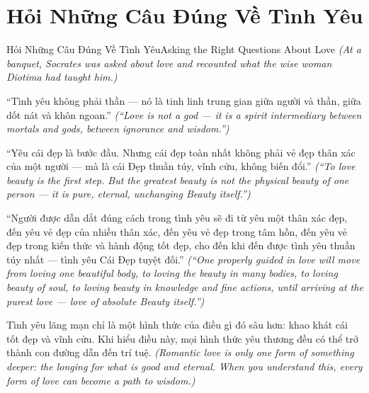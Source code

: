 \section{Hỏi Những Câu Đúng Về Tình Yêu}
\begin{truyen}{Hỏi Những Câu Đúng Về Tình Yêu}{Asking the Right Questions About Love}
\textit{(At a banquet, Socrates was asked about love and recounted what the wise woman Diotima had taught him.)}

``Tình yêu không phải thần — nó là tinh linh trung gian giữa người và thần, giữa dốt nát và khôn ngoan.''
\textit{(``Love is not a god — it is a spirit intermediary between mortals and gods, between ignorance and wisdom.'')}

``Yêu cái đẹp là bước đầu. Nhưng cái đẹp toàn nhất không phải vẻ đẹp thân xác của một người — mà là cái Đẹp thuần túy, vĩnh cửu, không biến đổi.''
\textit{(``To love beauty is the first step. But the greatest beauty is not the physical beauty of one person — it is pure, eternal, unchanging Beauty itself.'')}

``Người được dẫn dắt đúng cách trong tình yêu sẽ đi từ yêu một thân xác đẹp, đến yêu vẻ đẹp của nhiều thân xác, đến yêu vẻ đẹp trong tâm hồn, đến yêu vẻ đẹp trong kiến thức và hành động tốt đẹp, cho đến khi đến được tình yêu thuần túy nhất — tình yêu Cái Đẹp tuyệt đối.''
\textit{(``One properly guided in love will move from loving one beautiful body, to loving the beauty in many bodies, to loving beauty of soul, to loving beauty in knowledge and fine actions, until arriving at the purest love — love of absolute Beauty itself.'')}

\end{truyen}

\begin{baihoc}
Tình yêu lãng mạn chỉ là một hình thức của điều gì đó sâu hơn: khao khát cái tốt đẹp và vĩnh cửu. Khi hiểu điều này, mọi hình thức yêu thương đều có thể trở thành con đường dẫn đến trí tuệ.
\textit{(Romantic love is only one form of something deeper: the longing for what is good and eternal. When you understand this, every form of love can become a path to wisdom.)}
\end{baihoc}
\ngancach

